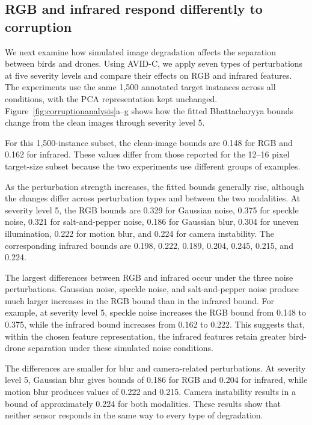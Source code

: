 \documentclass[10pt]{article}
\newcommand{\corrupt}{\textsc{AVID-C}}
\begin{document}
\subsection{RGB and infrared respond differently to corruption}

We next examine how simulated image degradation affects the separation between birds and drones. Using \corrupt{}, we apply seven types of perturbations at five severity levels and compare their effects on RGB and infrared features. The experiments use the same 1,500 annotated target instances across all conditions, with the PCA representation kept unchanged. Figure~\ref{fig:corruptionanalysis}a--g shows how the fitted Bhattacharyya bounds change from the clean images through severity level 5.

For this 1,500-instance subset, the clean-image bounds are 0.148 for RGB and 0.162 for infrared. These values differ from those reported for the 12--16 pixel target-size subset because the two experiments use different groups of examples.

As the perturbation strength increases, the fitted bounds generally rise, although the changes differ across perturbation types and between the two modalities. At severity level 5, the RGB bounds are 0.329 for Gaussian noise, 0.375 for speckle noise, 0.321 for salt-and-pepper noise, 0.186 for Gaussian blur, 0.304 for uneven illumination, 0.222 for motion blur, and 0.224 for camera instability. The corresponding infrared bounds are 0.198, 0.222, 0.189, 0.204, 0.245, 0.215, and 0.224.

The largest differences between RGB and infrared occur under the three noise perturbations. Gaussian noise, speckle noise, and salt-and-pepper noise produce much larger increases in the RGB bound than in the infrared bound. For example, at severity level 5, speckle noise increases the RGB bound from 0.148 to 0.375, while the infrared bound increases from 0.162 to 0.222. This suggests that, within the chosen feature representation, the infrared features retain greater bird-drone separation under these simulated noise conditions.

The differences are smaller for blur and camera-related perturbations. At severity level 5, Gaussian blur gives bounds of 0.186 for RGB and 0.204 for infrared, while motion blur produces values of 0.222 and 0.215. Camera instability results in a bound of approximately 0.224 for both modalities. These results show that neither sensor responds in the same way to every type of degradation.
\end{document}
